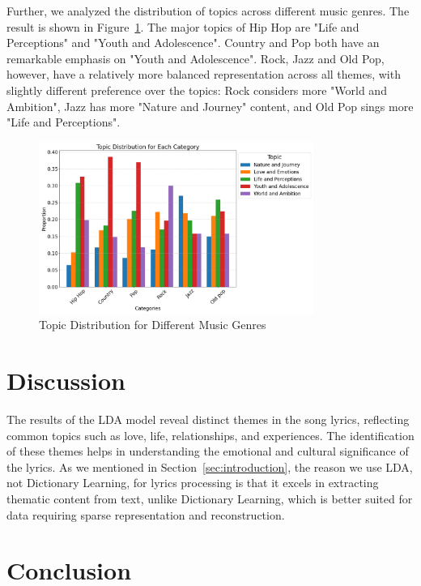\documentclass{article}
\begin{document}
\noindent Further, we analyzed the distribution of topics across different music genres. The result is shown in Figure~\ref{genres}. The major topics of Hip Hop are "Life and Perceptions" and "Youth and Adolescence". Country and Pop both have an remarkable emphasis on "Youth and Adolescence". Rock, Jazz and Old Pop, however, have a relatively more balanced representation across all themes, with slightly different preference over the topics: Rock considers more "World and Ambition", Jazz has more "Nature and Journey" content, and Old Pop sings more "Life and Perceptions".
\begin{figure}[H]
    \centering
    \includegraphics[width=0.8\textwidth]{genres.png}
    \caption{Topic Distribution for Different Music Genres}
    \label{genres}    
\end{figure}

\section{Discussion}

\noindent The results of the LDA model reveal distinct themes in the song lyrics, reflecting common topics such as love, life, relationships, and experiences. The identification of these themes helps in understanding the emotional and cultural significance of the lyrics. As we mentioned in Section~\ref{sec:introduction}, the reason we use LDA, not Dictionary Learning, for lyrics processing is that it excels in extracting thematic content from text, unlike Dictionary Learning, which is better suited for data requiring sparse representation and reconstruction.\\


\section{Conclusion}
\end{document}

